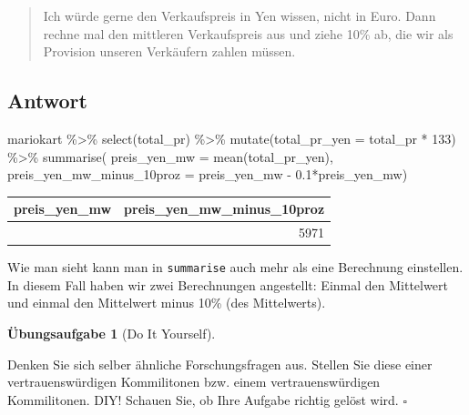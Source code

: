 \documentclass[
  a4paper,
  DIV=11]{scrreprt}
\newenvironment{Shaded}{\begin{snugshade}}{\end{snugshade}}
\newcommand{\AttributeTok}[1]{\textcolor[rgb]{0.40,0.45,0.13}{#1}}
\newcommand{\DecValTok}[1]{\textcolor[rgb]{0.68,0.00,0.00}{#1}}
\newcommand{\FloatTok}[1]{\textcolor[rgb]{0.68,0.00,0.00}{#1}}
\newcommand{\FunctionTok}[1]{\textcolor[rgb]{0.28,0.35,0.67}{#1}}
\newcommand{\NormalTok}[1]{\textcolor[rgb]{0.00,0.23,0.31}{#1}}
\newcommand{\SpecialCharTok}[1]{\textcolor[rgb]{0.37,0.37,0.37}{#1}}
\theoremstyle{definition}
\newtheorem{exercise}{Übungsaufgabe}[chapter]
\theoremstyle{definition}
\theoremstyle{definition}
\theoremstyle{remark}
\begin{document}
\begin{quote}
{} Ich würde gerne den Verkaufspreis in Yen wissen, nicht
in Euro. Dann rechne mal den mittleren Verkaufspreis aus und ziehe 10\%
ab, die wir als Provision unseren Verkäufern zahlen müssen.
\end{quote}

\subsection{Antwort}

\begin{Shaded}
\begin{Highlighting}[]
\NormalTok{mariokart }\SpecialCharTok{\%\textgreater{}\%} 
  \FunctionTok{select}\NormalTok{(total\_pr) }\SpecialCharTok{\%\textgreater{}\%} 
  \FunctionTok{mutate}\NormalTok{(}\AttributeTok{total\_pr\_yen =}\NormalTok{ total\_pr }\SpecialCharTok{*} \DecValTok{133}\NormalTok{) }\SpecialCharTok{\%\textgreater{}\%} 
  \FunctionTok{summarise}\NormalTok{(}
    \AttributeTok{preis\_yen\_mw =} \FunctionTok{mean}\NormalTok{(total\_pr\_yen),}
    \AttributeTok{preis\_yen\_mw\_minus\_10proz =}\NormalTok{ preis\_yen\_mw }\SpecialCharTok{{-}} \FloatTok{0.1}\SpecialCharTok{*}\NormalTok{preis\_yen\_mw)}
\end{Highlighting}
\end{Shaded}

\begin{longtable}[]{@{}rr@{}}
\toprule\noalign{}
preis\_yen\_mw & preis\_yen\_mw\_minus\_10proz \\
\midrule\noalign{}
\endhead
\bottomrule\noalign{}
\endlastfoot
6634 & 5971 \\
\end{longtable}

Wie man sieht kann man in \texttt{summarise} auch mehr als eine
Berechnung einstellen. In diesem Fall haben wir zwei Berechnungen
angestellt: Einmal den Mittelwert und einmal den Mittelwert minus 10\%
(des Mittelwerts).

\begin{exercise}[Do It
Yourself]\protect\hypertarget{exr-diy}{}\label{exr-diy}

Denken Sie sich selber ähnliche Forschungsfragen aus. Stellen Sie diese
einer vertrauenswürdigen Kommilitonen bzw. einem vertrauenswürdigen
Kommilitonen. DIY! Schauen Sie, ob Ihre Aufgabe richtig gelöst wird.
\(\square\)

\end{exercise}
\end{document}
